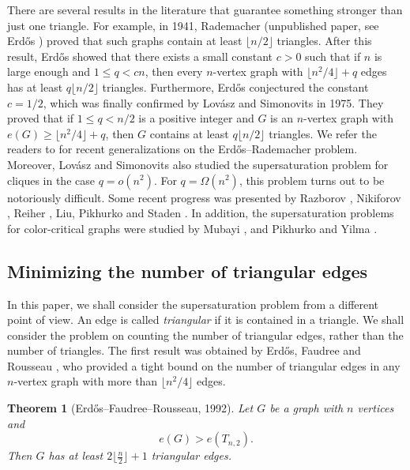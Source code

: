 \documentclass[11pt]{article}
\newtheorem{theorem}{Theorem}[section]
\begin{document}
\medskip 
There are several results in the literature that guarantee something stronger than just one triangle. 
 For example, in 1941, 
 Rademacher (unpublished paper, see Erd\H{o}s \cite{Erd1955,Erdos1964}) proved that such graphs contain at least $\lfloor n/2\rfloor$ triangles. 
 After this result, 
Erd\H{o}s \cite{Erd1962a,Erd1962b}
 showed that there exists a small constant
 $c>0$ such that if $n$ is large enough and $1\le q<cn$, then
 every $n$-vertex graph with $\lfloor n^2/4\rfloor +q$
 edges   has at least $q\lfloor {n}/{2}\rfloor$ triangles.
Furthermore, Erd\H{o}s conjectured the constant $c={1}/{2}$, which was finally confirmed by
Lov\'{a}sz and Simonovits \cite{LS1975,LS1983} 
in 1975. They  proved that 
if $1\le q <{n}/{2}$ is a positive integer and $G$ is an $n$-vertex graph with
$e(G)\ge \lfloor {n^2}/{4} \rfloor + q$,  
then $G$ contains at least $q \lfloor {n}/{2}\rfloor $
triangles.  
We refer the readers to \cite{XK2021,LM2022-Erd-Rad,BC2023}
for  recent generalizations on the Erd\H{o}s--Rademacher problem. 
Moreover, Lov\'{a}sz and Simonovits \cite{LS1983} 
also studied the supersaturation problem 
for cliques in the case $q=o(n^2)$. 
For $q=\Omega (n^2)$,  
this problem turns out to be notoriously difficult.
Some recent progress was presented by 
Razborov \cite{Raz2008}, Nikiforov \cite{Niki2011},  Reiher \cite{Rei2016}, Liu, Pikhurko and Staden 
\cite{LPS2020}. In addition, the supersaturation 
problems for color-critical graphs were studied by Mubayi \cite{Mub2010}, and Pikhurko and Yilma \cite{PY2017}. 
 
 
 \subsection{Minimizing the number of triangular edges}
 
 
 In this paper, we shall consider the supersaturation problem 
from a different point of view.  
 An edge is called {\it triangular} if it is contained in a triangle. 
 We shall consider the problem on counting 
 the number of triangular edges, rather than the number of triangles. 
The first result was obtained by 
 Erd\H{o}s, Faudree and Rousseau \cite{EFR1992}, who 
provided a tight bound on 
the number of triangular edges in any 
 $n$-vertex graph 
with more than $\lfloor n^2/4\rfloor$ edges. 



\begin{theorem}[Erd\H{o}s--Faudree--Rousseau, 1992] 
\label{thm-EFR}
Let $G$ be a graph with $n$ vertices and 
\[ e(G)> e(T_{n,2}).\] 
Then $G$ has at least $2 \lfloor \frac{n}{2} \rfloor +1$ triangular edges. 
\end{theorem} 
\end{document}

